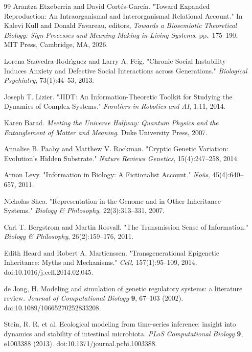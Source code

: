 \documentclass[pdflatex,sn-mathphys-num]{sn-jnl}
\theoremstyle{thmstylethree}
\theoremstyle{thmstyleone}
\begin{document}
\begin{thebibliography}{99}
Arantza Etxeberria and David Cort\'es-Garc\'ia.
"Toward Expanded Reproduction: An Intraorganismal and Interorganismal Relational Account."
In Kalevi Kull and Donald Favareau, editors,
\textit{Towards a Biosemiotic Theoretical Biology: Sign Processes and Meaning-Making in Living Systems},
pp.~175--190.
MIT Press, Cambridge, MA, 2026.

Lorena Saavedra-Rodr\'{\i}guez and Larry A. Feig.
"Chronic Social Instability Induces Anxiety and Defective Social Interactions across Generations."
\textit{Biological Psychiatry}, 73(1):44--53, 2013.

Joseph T. Lizier.
"JIDT: An Information-Theoretic Toolkit for Studying the Dynamics of Complex Systems."
\textit{Frontiers in Robotics and AI}, 1:11, 2014.

Karen Barad.
\textit{Meeting the Universe Halfway: Quantum Physics and the Entanglement of Matter and Meaning}.
Duke University Press, 2007.

Annalise B. Paaby and Matthew V. Rockman.
"Cryptic Genetic Variation: Evolution's Hidden Substrate."
\textit{Nature Reviews Genetics}, 15(4):247--258, 2014.

Arnon Levy.
"Information in Biology: A Fictionalist Account."
\textit{No\^{u}s}, 45(4):640--657, 2011.

Nicholas Shea.
"Representation in the Genome and in Other Inheritance Systems."
\textit{Biology \& Philosophy}, 22(3):313--331, 2007.

Carl T. Bergstrom and Martin Rosvall.
"The Transmission Sense of Information."
\textit{Biology \& Philosophy}, 26(2):159--176, 2011.

Edith Heard and Robert A. Martienssen.
"Transgenerational Epigenetic Inheritance: Myths and Mechanisms."
\textit{Cell}, 157(1):95--109, 2014.
doi:10.1016/j.cell.2014.02.045.


de Jong, H.
Modeling and simulation of genetic regulatory systems: a literature review.
\textit{Journal of Computational Biology} \textbf{9}, 67--103 (2002).
doi:10.1089/10665270252833208.

Stein, R. R. et al.
Ecological modeling from time-series inference: insight into dynamics and stability of intestinal microbiota.
\textit{PLoS Computational Biology} \textbf{9}, e1003388 (2013).
doi:10.1371/journal.pcbi.1003388.


\end{thebibliography}
\end{document}
